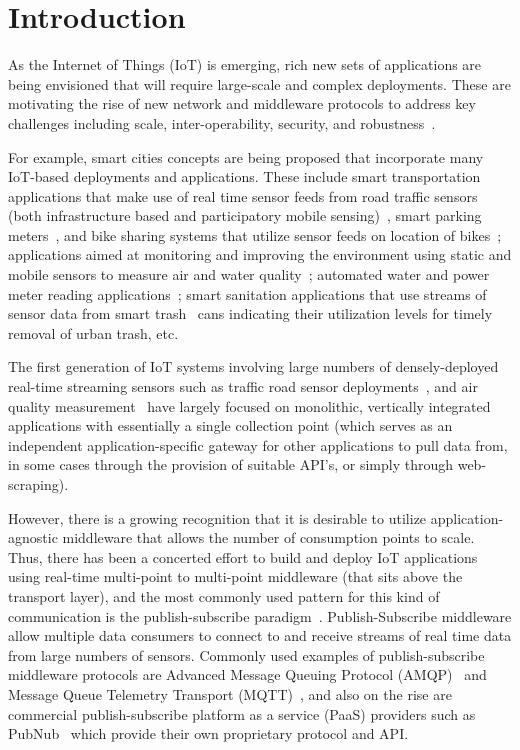 \section{Introduction}
\label{sec:intro}

As the Internet of Things (IoT) is emerging, rich new sets of applications are
being envisioned that will require large-scale and complex deployments. These
are motivating the rise of new network and middleware protocols to address key
challenges including scale, inter-operability, security, and
robustness~\cite{Stankovic14, al2015internet, sicari2015security}. 

For example, smart cities concepts are being proposed that incorporate many
IoT-based deployments and applications. These include smart transportation
applications that make use of real time sensor feeds from road traffic sensors
(both infrastructure based and participatory mobile
sensing)~\cite{leduc2008road, mohan2008nericell}, smart parking
meters~\cite{ji2014cloud}, and bike sharing systems that utilize sensor feeds
on location of bikes~\cite{midgley2009role}; applications aimed at monitoring
and improving the environment using static and mobile sensors to measure air
and water quality~\cite{dutta2009common, le2007design}; automated water and
power meter reading applications~\cite{khalifa2011survey}; smart sanitation
applications that use streams of sensor data from smart
trash~\cite{glouche2013smart} cans indicating their utilization levels for
timely removal of urban trash, etc. 

The first generation of IoT systems involving large numbers of densely-deployed
real-time streaming sensors such as traffic road sensor
deployments~\cite{pems17}, and air quality measurement~\cite{aqmd17} have
largely focused on monolithic, vertically integrated applications with
essentially a single collection point (which serves as an independent
application-specific gateway for other applications to pull data from, in some
cases through the provision of suitable API's, or simply through web-scraping). 

However, there is a growing recognition that it is desirable to utilize
application-agnostic middleware that allows the number of consumption points to
scale. Thus, there has been a concerted effort to build and deploy IoT
applications using real-time multi-point to multi-point middleware (that sits
above the transport layer), and the most commonly used pattern for this kind of
communication is the publish-subscribe paradigm~\cite{pubsub}.
Publish-Subscribe middleware allow multiple data consumers to connect to and
receive streams of real time data from large numbers of sensors. Commonly used
examples of publish-subscribe middleware protocols are Advanced Message Queuing
Protocol (AMQP)~\cite{amqp} and Message Queue Telemetry Transport (MQTT)~\cite{mqtt}, and
also on the rise are commercial publish-subscribe platform as a service (PaaS)
providers such as PubNub~\cite{pubnub} which provide their own proprietary
protocol and API.  

